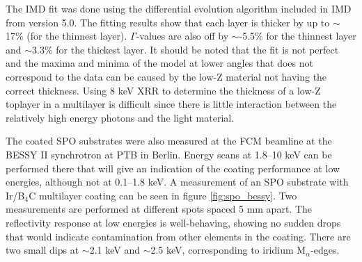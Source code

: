 The IMD fit was done using the differential evolution algorithm\cite{Bjoerck:2011fy} included in IMD from version 5.0. The fitting results show that each layer is thicker by up to $\sim$17\% (for the thinnest layer). $\Gamma$-values are also off by $\sim$-5.5\% for the thinnest layer and $\sim$3.3\% for the thickest layer. It should be noted that the fit is not perfect and the maxima and minima of the model at lower angles that does not correspond to the data can be caused by the low-Z material not having the correct thickness. Using 8 keV XRR to determine the thickness of a low-Z toplayer in a multilayer is difficult since there is little interaction between the relatively high energy photons and the light material.

The coated SPO substrates were also measured at the FCM beamline at the BESSY II synchrotron at PTB in Berlin. Energy scans at 1.8--10 keV can be performed there that will give an indication of the coating performance at low energies, although not at 0.1--1.8 keV. A measurement of an SPO substrate with Ir/B$_4$C multilayer coating can be seen in figure \ref{fig:spo_bessy}. Two measurements are performed at different spots spaced 5 mm apart. The reflectivity response at low energies is well-behaving, showing no sudden drops that would indicate contamination from other elements in the coating. There are two small dips at $\sim$2.1 keV and $\sim$2.5 keV, corresponding to iridium M$_{\alpha}$-edges.

